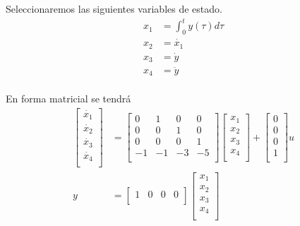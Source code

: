 \documentclass[12pt]{article}
\begin{document}
\begin{itemize}
    Seleccionaremos las siguientes variables de estado.
    \begin{equation}
        \begin{split}
        x_{1}&=\int_{0}^{t} y(\tau)d\tau\\
        x_{2}&=\dot{x_{1}}\\
        x_{3}&=\dot{y}\\
        x_{4}&=\ddot{y}\\
        \label{eq:state_ejem4}
        \end{split}
    \end{equation}

    En forma matricial se tendrá
    \begin{equation}
        \begin{split}
            \begin{bmatrix}
                \dot{x_{1}} \\
                \dot{x_{2}} \\
                \dot{x_{3}} \\
                \dot{x_{4}} \\
            \end{bmatrix}&=
            \begin{bmatrix}
                0 & 1 & 0 & 0\\
                0 & 0 & 1 & 0\\
                0 & 0 & 0 & 1\\
                -1 & -1 & -3 & -5\\
            \end{bmatrix}
            \begin{bmatrix}
                x_{1} \\
                x_{2} \\
                x_{3} \\
                x_{4} \\
            \end{bmatrix}+
            \begin{bmatrix}
                0 \\
                0 \\
                0 \\
                1 \\
            \end{bmatrix}u\\
            y&=
            \begin{bmatrix}
                1 & 0 & 0 & 0\\
            \end{bmatrix}
            \begin{bmatrix}
                x_{1} \\
                x_{2} \\
                x_{3} \\
                x_{4} \\
            \end{bmatrix}\\
        \label{eq:state_ejem42}
        \end{split}
    \end{equation}

\end{itemize}
\end{document}
